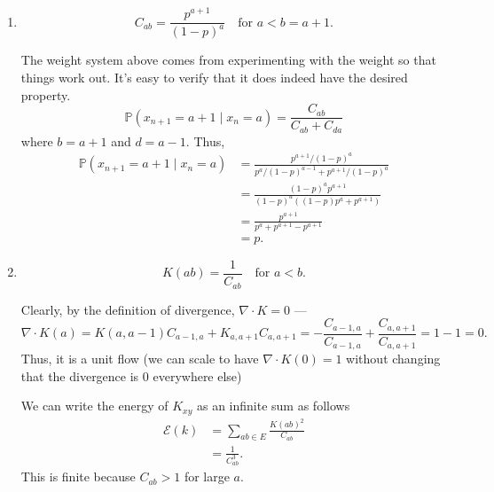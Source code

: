 \documentclass[12 pt, letterpaper]{hmcpset}
\begin{document}
\begin{solution}
	\begin{enumerate}
		\item 
			\[
				\boxed{
					C_{ab} = \frac{p^{a + 1}}{(1 - p)^{a}} \quad \text{for } a < b = a + 1.
				}
			\]

			The weight system above comes from experimenting with the weight so that things work out. It's easy to verify that it does indeed have the desired property.
			\[
				\mathbb{P}(x_{n + 1} = a + 1 \mid x_{n} = a) = \frac{C_{ab}}{C_{ab} + C_{da}}
			\]
			where $b = a + 1$ and $d = a - 1$. Thus,
			\begin{align*}
				\mathbb{P}(x_{n + 1} = a + 1 \mid x_{n} = a) & = \frac{p^{a + 1} / (1 - p)^{a}}{p^{a} / (1 - p)^{a - 1} + p^{a + 1} / (1 - p)^{a}} \\
									     & = \frac{(1 - p)^{a} p^{a + 1}}{(1 - p)^{a}((1 - p) p^{a} + p^{a + 1})} \\
									     & = \frac{p^{a + 1}}{p^{a} + p^{a + 1} - p^{a + 1}} \\
									     & = p.
			\end{align*}
		
		\item 
			\[
				\boxed{
					K(ab) = \frac{1}{C_{ab}} \quad \text{for } a < b.
				}
			\]

			Clearly, by the definition of divergence, $\nabla \cdot K = 0$ ---
			\[
				\nabla \cdot K(a) = K(a, a - 1) C_{a - 1, a} + K_{a, a + 1} C_{a, a + 1} = - \frac{C_{a - 1, a}}{C_{a - 1, a}} + \frac{C_{a, a + 1}}{C_{a, a + 1}} = 1 - 1 = 0.
			\]
			Thus, it is a unit flow (we can scale to have $\nabla \cdot K(0) = 1$ without changing that the divergence is $0$ everywhere else)

			We can write the energy of $K_{xy}$ as an infinite sum as follows
			\begin{align*}
				\mathcal{E}(k) & = \sum_{ab \in E} \frac{K(ab)^{2}}{C_{ab}} \\
					       & = \frac{1}{C_{ab}^{3}}.
			\end{align*}
			This is finite because $C_{ab} > 1$ for large $a$.
	\end{enumerate}
\end{solution}
\end{document}
